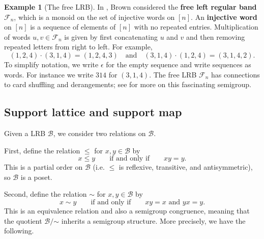 \documentclass[11pt, oneside, reqno]{amsart}
\theoremstyle{definition}
\newtheorem{example}[theorem]{Example}
\numberwithin{equation}{section}
\newcommand{\defn}[1]{{\color{RoyalBlue}\bf#1}}
\def \BB{{\mathcal{B}}}
\def\qqiff{\qquad\text{if and only if}\qquad}
\begin{document}
\begin{example}[The free LRB]\label{ex:freelrb} \rm
    In \cite{BrownOnLRBs}, Brown considered the \defn{free left regular band}
    $\mathscr{F}_n$, which is a monoid on the set of injective words on
    $[n]$. An \defn{injective word} on $[n]$ is a sequence of elements of $[n]$
    with no repeated entries. Multiplication of words $u,v \in \mathscr{F}_n$
    is given by first concatenating $u$ and $v$ and then removing repeated
    letters from right to left. For example,
    \[ (1, 2, 4) \cdot (3,1,4) = (1,2,4,3)
    \quad\text{and}\quad
    (3,1,4)  \cdot (1, 2, 4) = (3,1,4,2).\]
    To simplify notation, we write $\epsilon$ for the empty sequence and
     write sequences as words. For instance we write $314$ for $(3,1,4)$.
    The free LRB $\mathscr{F}_n$ has connections to card shuffling and derangements; see \cite{brauner2022invariant} for more on this fascinating semigroup.
\end{example}

\subsection{Support lattice and support map}\label{ss:LRBrelations}

Given a LRB $\BB$, we consider two relations on $\BB$.

First, define the relation $\leq$ for $x, y \in \BB$ by
\[ x \leq y \qqiff xy=y. \]
This is a partial order on $\BB$ (i.e. $ \leq$ is reflexive, transitive, and antisymmetric),
so $\BB$ is a poset.

Second, define the relation $\sim$ for $x, y \in \BB$ by
\begin{equation*}
    x \sim y
    \qqiff
    x y = x
    \text{~and~}
    y x = y.
\end{equation*}
This is an equivalence relation and also a semigroup congruence, meaning that
the quotient $\BB/\mathord{\sim}$ inherits a semigroup structure. More
precisely, we have the following.
\end{document}
